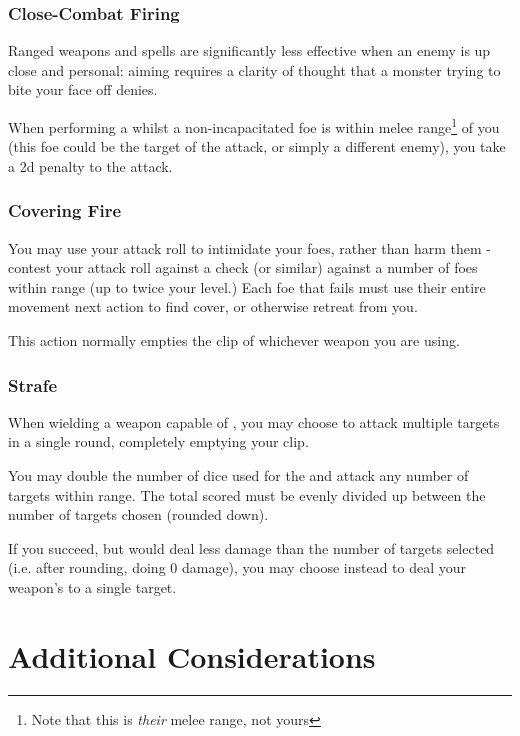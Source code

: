 \subsubsection{Close-Combat Firing}

Ranged weapons and spells are significantly less effective when an enemy is up close and personal: aiming requires a clarity of thought that a monster trying to bite your face off denies. 

When performing a  whilst a non-incapacitated foe is within melee range\footnote{Note that this is {\it their} melee range, not yours} of you (this foe could be the target of the attack, or simply a different enemy), you take a 2d penalty to the attack. 


\subsubsection{Covering Fire}

You may use your attack roll to intimidate your foes, rather than harm them - contest your attack roll against a  check (or similar) against a number of foes within range (up to twice your  level.) Each foe that fails must use their entire movement next action to find cover, or otherwise retreat from you. 

This action normally empties the clip of whichever weapon you are using. 


\subsubsection{Strafe}

When wielding a weapon capable of , you may choose to attack multiple targets in a single round, completely emptying your clip. 

You may double the number of dice used for the  and attack any number of targets within range. The total  scored must be evenly divided up between the number of targets chosen (rounded down). 

If you succeed, but would deal less damage than the number of targets selected (i.e. after rounding, doing 0 damage), you may choose instead to deal your weapon's  to a single target. 



\section{Additional Considerations}

